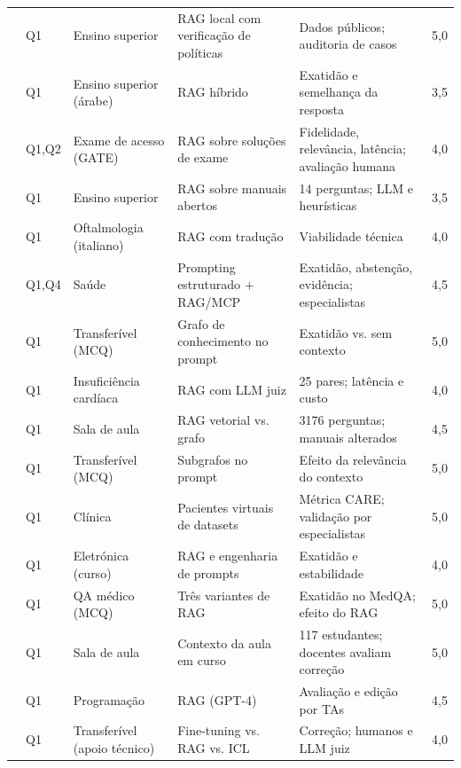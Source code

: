 {\begin{longtable}{p{2.6cm} p{0.95cm} p{2.3cm} p{3.0cm} p{2.95cm} p{0.5cm}}
\textcite{wei2026cloud} & Q1 & Ensino superior & RAG local com verificação de políticas & Dados públicos; auditoria de casos & 5,0 \\
\textcite{tawfik2025mufakkir} & Q1 & Ensino superior (árabe) & RAG híbrido & Exatidão e semelhança da resposta & 3,5 \\
\textcite{khan2025towards} & Q1,Q2 & Exame de acesso (GATE) & RAG sobre soluções de exame & Fidelidade, relevância, latência; avaliação humana & 4,0 \\
\textcite{sayeed2026tutor} & Q1 & Ensino superior & RAG sobre manuais abertos & 14 perguntas; LLM e heurísticas & 3,5 \\
\textcite{ruga2025conversational} & Q1 & Oftalmologia (italiano) & RAG com tradução & Viabilidade técnica & 4,0 \\
\textcite{ishadya2026mitigating} & Q1,Q4 & Saúde & Prompting estruturado + RAG/MCP & Exatidão, abstenção, evidência; especialistas & 4,5 \\
\textcite{ghanbari2025evaluating} & Q1 & Transferível (MCQ) & Grafo de conhecimento no prompt & Exatidão vs. sem contexto & 5,0 \\
\textcite{bellard2025development} & Q1 & Insuficiência cardíaca & RAG com LLM juiz & 25 pares; latência e custo & 4,0 \\
\textcite{jain2025aligning} & Q1 & Sala de aula & RAG vetorial vs. grafo & 3176 perguntas; manuais alterados & 4,5 \\
\textcite{ghanbari2025quantifying} & Q1 & Transferível (MCQ) & Subgrafos no prompt & Efeito da relevância do contexto & 5,0 \\
\textcite{oh2026automedic} & Q1 & Clínica & Pacientes virtuais de datasets & Métrica CARE; validação por especialistas & 5,0 \\
\textcite{yan2026question} & Q1 & Eletrónica (curso) & RAG e engenharia de prompts & Exatidão e estabilidade & 4,0 \\
\textcite{xie2026when} & Q1 & QA médico (MCQ) & Três variantes de RAG & Exatidão no MedQA; efeito do RAG & 5,0 \\
\textcite{liu2026asknow} & Q1 & Sala de aula & Contexto da aula em curso & 117 estudantes; docentes avaliam correção & 5,0 \\
\textcite{miroyan2025analyzing} & Q1 & Programação & RAG (GPT-4) & Avaliação e edição por TAs & 4,5 \\
\textcite{zheng2026comparative} & Q1 & Transferível (apoio técnico) & Fine-tuning vs. RAG vs. ICL & Correção; humanos e LLM juiz & 4,0 \\

\end{longtable}}
